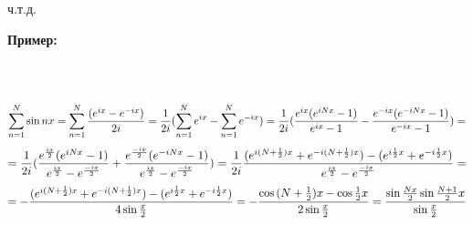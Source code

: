\documentclass[book, 11pt]{report}
\begin{document}
        \par{{\raggedleft ч.т.д.\par}}
        \vspace{0.5cm}
        \par{
        \textbf{Пример:}
        }
        \par{\\
         \\
        \begin{equation*}
            \sum_{n=1}^N\sin{nx}=\sum_{n=1}^N{(e^{ix}-e^{-ix})\over{2i}}={1\over{2i}}(\sum_{n=1}^Ne^{ix}-\sum_{n=1}^Ne^{-ix})={1\over{2i}}(\frac{e^{ix}(e^{iNx}-1)}{e^{ix}-1}-\frac{e^{-ix}(e^{-iNx}-1)}{e^{-ix}-1})=
        \end{equation*}
        \begin{equation*}
            ={1\over{2i}}(\frac{e^{ix\over2}(e^{iNx}-1)
                }{e^{ix\over2}-e^{-ix\over2}}+\frac{e^{-ix\over{2}}(e^{-iNx}-1)}{e^{ix\over2}-e^{-ix\over2}})={1\over{2i}}\frac{(e^{i(N+{1\over{2}})x}+e^{-i(N+{1\over{2}})x})-(e^{i{1\over{2}}x}+e^{-i{1\over{2}}x})}{e^{ix\over2}-e^{-ix\over2}}=
        \end{equation*}
        \begin{equation*}
            =-\frac{(e^{i(N+{1\over{2}})x}+e^{-i(N+{1\over{2}})x})-(e^{i{1\over{2}}x}+e^{-i{1\over{2}}x})}{4\sin{x\over{2}}}=-\frac{\cos{(N+{1\over2})x}-\cos{{1\over2}x}}{2\sin{x\over2}}=\frac{\sin{Nx\over{2}}\sin{{N+1\over2}x}}{\sin{x\over2}}
        \end{equation*}
        }
        \vspace{0.7cm}
\end{document}
